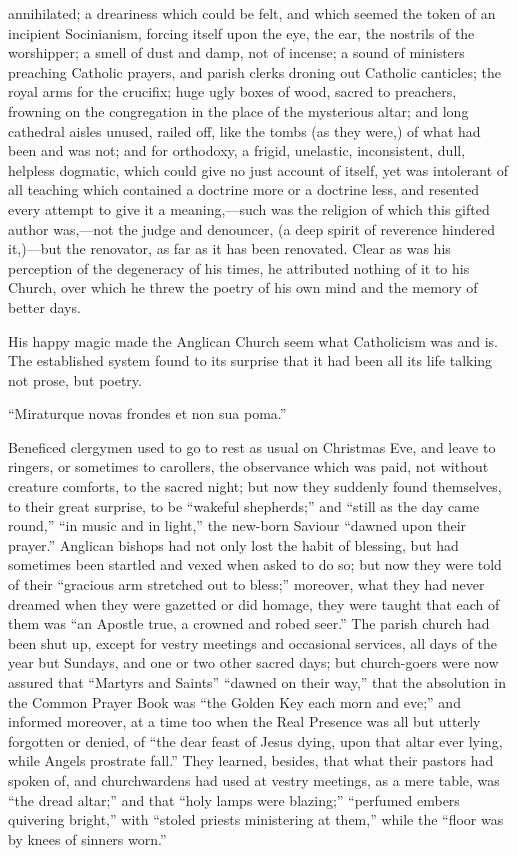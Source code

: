 annihilated; a dreariness which could be felt, and which seemed the
token of an incipient Socinianism, forcing itself upon the eye, the
ear, the nostrils of the worshipper; a smell of dust and damp, not of
incense; a sound of ministers preaching Catholic prayers, and parish
clerks droning out Catholic canticles; the royal arms for the
crucifix; huge ugly boxes of wood, sacred to preachers, frowning on
the congregation in the place of the mysterious altar; and long
cathedral aisles unused, railed off, like the tombs (as they were,) of
what had been and was not; and for orthodoxy, a frigid, unelastic,
inconsistent, dull, helpless dogmatic, which could give no just
account of itself, yet was intolerant of all teaching which contained
a doctrine more or a doctrine less, and resented every attempt to give
it a meaning,—such was the religion of which this gifted author
was,—not the judge and denouncer, (a deep spirit of reverence
hindered it,)—but the renovator, as far as it has been renovated.
Clear as was his perception of the degeneracy of his times, he
attributed nothing of it to his Church, over which he threw the poetry
of his own mind and the memory of better days.

His happy magic made the Anglican Church seem
what Catholicism was and is. The established system found to its
surprise that it had been all its life talking not prose, but poetry.

``Miraturque
novas frondes et non sua poma.''

Beneficed clergymen used to go to rest as usual
on Christmas Eve, and leave to ringers, or sometimes to carollers, the
observance which was paid, not without creature comforts, to the
sacred night; but now they suddenly found themselves, to their great
surprise, to be ``wakeful shepherds;'' and ``still as the day came round,''
``in music and in light,'' the new-born Saviour ``dawned upon their
prayer.'' Anglican bishops had not only lost the habit of blessing, but
had sometimes been startled and vexed when asked to do so; but now
they were told of their ``gracious arm stretched out to bless;''
moreover, what they had never dreamed when they were gazetted or did
homage, they were taught that each of them was ``an Apostle true, a
crowned and robed seer.'' The parish church had been shut up, except
for vestry meetings and occasional services, all days of the year but
Sundays, and one or two other sacred days; but church-goers were now
assured that ``Martyrs and Saints'' ``dawned on their way,''
that the absolution in the Common Prayer Book was ``the Golden Key each
morn and eve;'' and informed moreover, at a time too when the Real
Presence was all but utterly forgotten or denied, of ``the dear feast
of Jesus dying, upon that altar ever lying, while Angels prostrate
fall.'' They learned, besides, that what their pastors had spoken of,
and churchwardens had used at vestry meetings, as a mere table, was ``the
dread altar;'' and that ``holy lamps were blazing;'' ``perfumed embers
quivering bright,'' with ``stoled priests ministering at them,'' while
the ``floor was by knees of sinners worn.''

